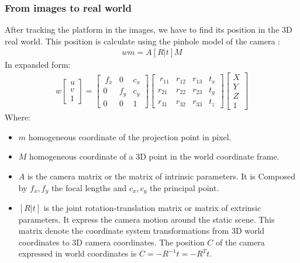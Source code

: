 \subsubsection{From images to real world}
After tracking the platform in the images, we have to find its position in the 3D real world. This position is calculate using the pinhole model of the camera \cite{weng1992camera}:
\begin{align}
wm = A [R|t]M
 \label{eq:pinholemodel}
\end{align}
In expanded form:
\begin{align}
{w\begin{bmatrix}
u \\[10pt]
v  \\[10pt]
1
\end{bmatrix}}=
{\begin{bmatrix}\
f_x & 0 & c_x \\[10pt]
0 & f_y &c_y \\[10pt]
0 & 0 & 1
\end{bmatrix}}
{\begin{bmatrix}\
r_{11} & r_{12} & r_{13} & t_{x} \\[10pt]
r_{21} & r_{22} & r_{23} & t_{y} \\[10pt]
r_{31} & r_{32} & r_{33} & t_{z}
\end{bmatrix}}
{\begin{bmatrix}
X \\[10pt]
Y \\[10pt]
Z \\[10pt]
1
\end{bmatrix}}
\end{align}
Where:
\begin{itemize}
 \item $m$ homogeneous coordinate of the projection point in pixel.
  \item $M$ homogeneous coordinate of a 3D point in the world coordinate frame.
 \item $A$ is the camera matrix or the matrix of intrinsic parameters. It is Composed by $f_x,f_y$ the focal lengths and $c_x,c_y$ the principal point.
 \item $[R|t]$ is the joint rotation-translation matrix or matrix of extrinsic parameters. It express the camera motion around the static scene. This matrix denote the coordinate system transformations from 3D world coordinates to 3D camera coordinates. The position $C$ of the camera expressed in world coordinates is $C=-R^{{-1}}t=-R^{T}t$.
\end{itemize}

